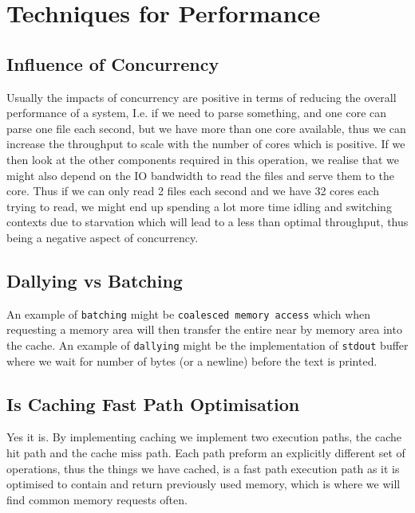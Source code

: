 \chapter{Techniques for Performance}
\section{Influence of Concurrency}
Usually the impacts of concurrency are positive in terms of reducing the overall performance of a system, I.e. if we need to parse something, and one core can parse one file each second, but we have more than one core available, thus we can increase the throughput to scale with the number of cores which is positive.\n
If we then look at the other components required in this operation, we realise that we might also depend on the IO bandwidth to read the files and serve them to the core. Thus if we can only read 2 files each second and we have 32 cores each trying to read, we might end up spending a lot more time idling and switching contexts due to starvation which will lead to a less than optimal throughput, thus being a negative aspect of concurrency.

\section{Dallying vs Batching}
An example of \texttt{batching} might be \texttt{coalesced memory access} which when requesting a memory area will then transfer the entire near by memory area into the cache.\n
An example of \texttt{dallying} might be the implementation of \texttt{stdout} buffer where we wait for number of bytes (or a newline) before the text is printed.

\section{Is Caching Fast Path Optimisation}
Yes it is. By implementing caching we implement two execution paths, the cache hit path and the cache miss path. Each path preform an explicitly different set of operations, thus the things we have cached, is a fast path execution path as it is optimised to contain and return previously used memory, which is where we will find common memory requests often.